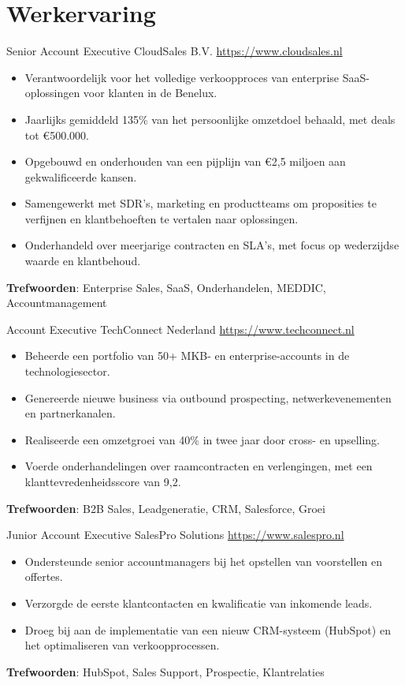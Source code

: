 \documentclass[a4paper, serif, 10pt]{moderncv}
\begin{document}
\section{Werkervaring}

        {Senior Account Executive}
        {CloudSales B.V.}
        {\url{https://www.cloudsales.nl}}
        {}
        {\begin{itemize}
\item Verantwoordelijk voor het volledige verkoopproces van enterprise SaaS-oplossingen voor klanten in de Benelux.
\item Jaarlijks gemiddeld 135\% van het persoonlijke omzetdoel behaald, met deals tot €500.000.
\item Opgebouwd en onderhouden van een pijplijn van €2,5 miljoen aan gekwalificeerde kansen.
\item Samengewerkt met SDR's, marketing en productteams om proposities te verfijnen en klantbehoeften te vertalen naar oplossingen.
\item Onderhandeld over meerjarige contracten en SLA's, met focus op wederzijdse waarde en klantbehoud.
\end{itemize}
\textbf{Trefwoorden}: Enterprise Sales, SaaS, Onderhandelen, MEDDIC, Accountmanagement}

        {Account Executive}
        {TechConnect Nederland}
        {\url{https://www.techconnect.nl}}
        {}
        {\begin{itemize}
\item Beheerde een portfolio van 50+ MKB- en enterprise-accounts in de technologiesector.
\item Genereerde nieuwe business via outbound prospecting, netwerkevenementen en partnerkanalen.
\item Realiseerde een omzetgroei van 40\% in twee jaar door cross- en upselling.
\item Voerde onderhandelingen over raamcontracten en verlengingen, met een klanttevredenheidsscore van 9,2.
\end{itemize}
\textbf{Trefwoorden}: B2B Sales, Leadgeneratie, CRM, Salesforce, Groei}

        {Junior Account Executive}
        {SalesPro Solutions}
        {\url{https://www.salespro.nl}}
        {}
        {\begin{itemize}
\item Ondersteunde senior accountmanagers bij het opstellen van voorstellen en offertes.
\item Verzorgde de eerste klantcontacten en kwalificatie van inkomende leads.
\item Droeg bij aan de implementatie van een nieuw CRM-systeem (HubSpot) en het optimaliseren van verkoopprocessen.
\end{itemize}
\textbf{Trefwoorden}: HubSpot, Sales Support, Prospectie, Klantrelaties}
\end{document}
